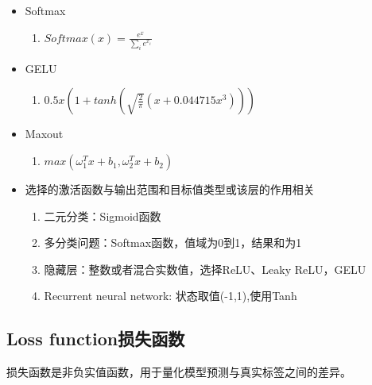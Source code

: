 \documentclass[UTF8]{ctexart}
\begin{document}
\begin{itemize}
\begin{enumerate}
    \end{enumerate}
    \item Softmax
    \begin{enumerate}
        \item $Softmax(x)=\frac{e^{x}}{\sum\limits_{i}e^{x_{i}}}$
    \end{enumerate}
    \item GELU
    \begin{enumerate}
        \item $0.5x(1+tanh(\sqrt{\frac{2}{\pi}}(x+0.044715x^3)))$
    \end{enumerate}
    \item Maxout
    \begin{enumerate}
        \item $max(\omega^T_1x+b_1,\omega^T_2x+b_2)$
    \end{enumerate}
    \item 选择的激活函数与输出范围和目标值类型或该层的作用相关
    \begin{enumerate}
        \item 二元分类：Sigmoid函数
        \item 多分类问题：Softmax函数，值域为0到1，结果和为1
        \item 隐藏层：整数或者混合实数值，选择ReLU、Leaky ReLU，GELU
        \item Recurrent neural network: 状态取值(-1,1),使用Tanh
    \end{enumerate}
\end{itemize}

\subsection{Loss function损失函数}
损失函数是非负实值函数，用于量化模型预测与真实标签之间的差异。
\end{document}
